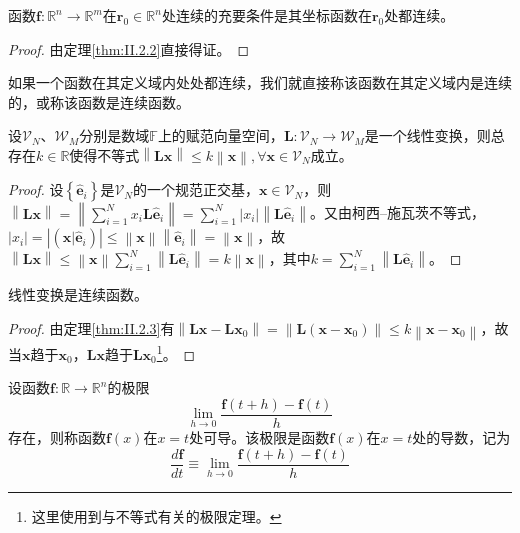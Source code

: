 \documentclass[main.tex]{subfiles}
\begin{document}
\begin{theorem}\label{thm:II.2.3}
函数$\mathbf{f}:\mathbb{R}^n\rightarrow\mathbb{R}^m$在$\mathbf{r}_0\in\mathbb{R}^n$处连续的充要条件是其坐标函数在$\mathbf{r}_0$处都连续。
\end{theorem}
\begin{proof}
由定理\ref{thm:II.2.2}直接得证。
\end{proof}

如果一个函数在其定义域内处处都连续，我们就直接称该函数在其定义域内是连续的，或称该函数是连续函数。

\begin{theorem}\label{thm:II.2.4}
设$\mathcal{V}_N$、$\mathcal{W}_M$分别是数域$\mathbb{F}$上的赋范向量空间，$\mathbf{L}:\mathcal{V}_N\rightarrow\mathcal{W}_M$是一个线性变换，则总存在$k\in\mathbb{R}$使得不等式$\left\|\mathbf{Lx}\right\|\leq k\left\|\mathbf{x}\right\|,\forall\mathbf{x}\in\mathcal{V}_N$成立。
\end{theorem}
\begin{proof}
设$\left\{\mathbf{\hat{e}}_i\right\}$是$\mathcal{V}_N$的一个规范正交基，$\mathbf{x}\in\mathcal{V}_N$，则$\left\|\mathbf{Lx}\right\|=\left\|\sum_{i=1}^Nx_i\mathbf{L}\mathbf{\hat{e}}_i\right\|=\sum_{i=1}^N\left|x_i\right|\left\|\mathbf{L\hat{e}}_i\right\|$。又由柯西--施瓦茨不等式，$\left|x_i\right|=\left|\left(\mathbf{x}|\mathbf{\hat{e}}_i\right)\right|\leq\left\|\mathbf{x}\right\|\left\|\mathbf{\hat{e}}_i\right\|=\left\|\mathbf{x}\right\|$，故$\left\|\mathbf{Lx}\right\|\leq\left\|\mathbf{x}\right\|\sum_{i=1}^N\left\|\mathbf{L\hat{e}}_i\right\|=k\left\|\mathbf{x}\right\|$，其中$k=\sum_{i=1}^N\left\|\mathbf{L\hat{e}}_i\right\|$。
\end{proof}

\begin{corollary}
线性变换是连续函数。
\end{corollary}
\begin{proof}
由定理\ref{thm:II.2.3}有$\left\|\mathbf{Lx}-\mathbf{Lx}_0\right\|=\left\|\mathbf{L}\left(\mathbf{x}-\mathbf{x}_0\right)\right\|\leq k\left\|\mathbf{x}-\mathbf{x}_0\right\|$，故当$\mathbf{x}$趋于$\mathbf{x}_0$，$\mathbf{Lx}$趋于$\mathbf{Lx}_0$\footnote{这里使用到与不等式有关的极限定理。}。
\end{proof}

\begin{definition}[一元向量函数的导数]
设函数$\mathbf{f}:\mathbb{R}\rightarrow\mathbb{R}^n$的极限
\[
\lim_{h\to 0}\frac{\mathbf{f}\left(t+h\right)-\mathbf{f}\left(t\right)}{h}
\]
存在，则称函数$\mathbf{f}\left(x\right)$在$x=t$处可导。该极限是函数$\mathbf{f}\left(x\right)$在$x=t$处的导数，记为
\[
\frac{d\mathbf{f}}{dt}\equiv\lim_{h\to 0}\frac{\mathbf{f}\left(t+h\right)-\mathbf{f}\left(t\right)}{h}
\]
\end{definition}
\end{document}
